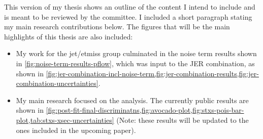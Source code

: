 This version of my thesis shows an outline of the content I intend to include and is meant to be reviewed by the committee.
I included a short paragraph stating my main research contributions below.
The figures that will be the main highlights of this thesis are also included:

\begin{itemize}
    \item My work for the jet/etmiss group culminated in the noise term results shown in \cref{fig:noise-term-results-pflow}, which was input to the JER combination, as shown in \cref{fig:jer-combination-incl-noise-term,fig:jer-combination-results,fig:jer-combination-uncertainties}.
    \item My main research focused on the \HWW analysis. The currently public results are shown in \cref{fig:post-fit-final-discriminatns,fig:avocado-plot,fig:stxs-pois-bar-plot,tab:stxs-xsec-uncertainties} (Note: these results will be updated to the ones included in the upcoming paper).
\end{itemize}
